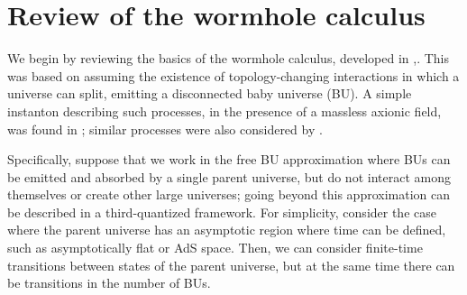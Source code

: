 \documentclass[11pt]{article}
\numberwithin{equation}{section}
\begin{document}
\section{Review of the wormhole calculus}

We begin by reviewing the basics of the wormhole calculus, developed in \cite{GiStInc},\cite{Cole}. This was based on assuming the existence of topology-changing interactions in which a universe can split, emitting a disconnected baby universe (BU).  A simple instanton describing such processes, in the presence of a massless axionic field, was found in \cite{GiStAx}; similar processes were also considered by \cite{Hawking:1987mz, Lavrelashvili:1987jg, Klebanov:1988eh, Rubakov:1988jf, Rey:1989mg, ColeCC,Polchinski:1994zs, Maldacena:2004rf, ArkaniHamed:2007js}.  

Specifically, suppose that we work in the free BU approximation where BUs can be emitted and absorbed by a single parent universe, but do not interact among themselves or create other large universes; going beyond this approximation can be described in a third-quantized framework\cite{GiSt3Q}.  For simplicity, consider the case where the parent universe has an asymptotic region where time can be defined, such as asymptotically flat or AdS space.  Then, we can consider finite-time transitions between states of the parent universe, but at the same time there can be transitions in the number of BUs.
\end{document}

